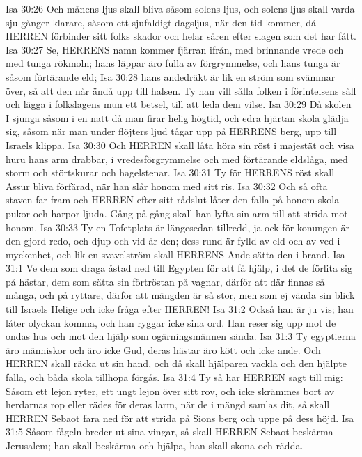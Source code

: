 Isa 30:26  Och månens ljus skall bliva såsom solens ljus, och solens ljus skall varda sju gånger klarare, såsom ett sjufaldigt dagsljus, när den tid kommer, då HERREN förbinder sitt folks skador och helar såren efter slagen som det har fått.
Isa 30:27  Se, HERRENS namn kommer fjärran ifrån, med brinnande vrede och med tunga rökmoln; hans läppar äro fulla av förgrymmelse, och hans tunga är såsom förtärande eld;
Isa 30:28  hans andedräkt är lik en ström som svämmar över, så att den når ändå upp till halsen. Ty han vill sålla folken i förintelsens såll och lägga i folkslagens mun ett betsel, till att leda dem vilse.
Isa 30:29  Då skolen I sjunga såsom i en natt då man firar helig högtid, och edra hjärtan skola glädja sig, såsom när man under flöjters ljud tågar upp på HERRENS berg, upp till Israels klippa.
Isa 30:30  Och HERREN skall låta höra sin röst i majestät och visa huru hans arm drabbar, i vredesförgrymmelse och med förtärande eldslåga, med storm och störtskurar och hagelstenar.
Isa 30:31  Ty för HERRENS röst skall Assur bliva förfärad, när han slår honom med sitt ris.
Isa 30:32  Och så ofta staven far fram och HERREN efter sitt rådslut låter den falla på honom skola pukor och harpor ljuda. Gång på gång skall han lyfta sin arm till att strida mot honom.
Isa 30:33  Ty en Tofetplats är längesedan tillredd, ja ock för konungen är den gjord redo, och djup och vid är den; dess rund är fylld av eld och av ved i myckenhet, och lik en svavelström skall HERRENS Ande sätta den i brand.
Isa 31:1  Ve dem som draga åstad ned till Egypten för att få hjälp, i det de förlita sig på hästar, dem som sätta sin förtröstan på vagnar, därför att där finnas så många, och på ryttare, därför att mängden är så stor, men som ej vända sin blick till Israels Helige och icke fråga efter HERREN!
Isa 31:2  Också han är ju vis; han låter olyckan komma, och han ryggar icke sina ord. Han reser sig upp mot de ondas hus och mot den hjälp som ogärningsmännen sända.
Isa 31:3  Ty egyptierna äro människor och äro icke Gud, deras hästar äro kött och icke ande. Och HERREN skall räcka ut sin hand, och då skall hjälparen vackla och den hjälpte falla, och båda skola tillhopa förgås.
Isa 31:4  Ty så har HERREN sagt till mig: Såsom ett lejon ryter, ett ungt lejon över sitt rov, och icke skrämmes bort av herdarnas rop eller rädes för deras larm, när de i mängd samlas dit, så skall HERREN Sebaot fara ned för att strida på Sions berg och uppe på dess höjd.
Isa 31:5  Såsom fågeln breder ut sina vingar, så skall HERREN Sebaot beskärma Jerusalem; han skall beskärma och hjälpa, han skall skona och rädda.
